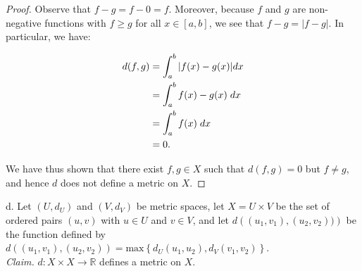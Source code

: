 \begin{proof}
        \pagebreak
        Observe that $f - g = f - 0 = f$. Moreover, because $f$ and $g$ are non-negative functions with $f \ge g$ for 
        all $x \in [a, b]$, we see that $f - g = |f - g|$. In particular, we have:
        
        \begin{align*}
            d(f, g) &= \int_a^b{|f(x) - g(x)|dx} \\
                    &= \int_a^b{f(x) - g(x) \hspace{1mm} dx} \\
                    &= \int_a^b{f(x) \hspace{1mm} dx} \\
                    &= 0.
        \end{align*}

        We have thus shown that there exist $f, g \in X$ such that $d(f, g) = 0$ but $f \neq g$, and hence $d$ does not
        define a metric on $X$.
            
    \end{proof}

    \pagebreak

d.  Let $(U, d_U)$ and $(V, d_V)$ be metric spaces, let $X = U \times V$
    be the set of ordered pairs $(u, v)$ with $u \in U$ and $v \in V$, and
    let $d\left((u_1, v_1), (u_2, v_2))\right)$ be the function defined by
    $d\left((u_1, v_1), (u_2, v_2)\right) 
     = \text{max}\left\{d_U(u_1, u_2), d_V(v_1, v_2)\right\}$. \ \\
    
    \emph{Claim.} $d:X \times X \to \mathbb{R}$ defines a metric on $X$.
    \ \\

